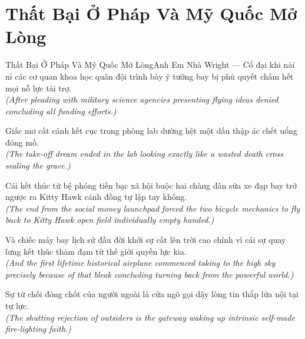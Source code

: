 \section{Thất Bại Ở Pháp Và Mỹ Quốc Mở Lòng}
\begin{truyen}{Thất Bại Ở Pháp Và Mỹ Quốc Mở Lòng}{Anh Em Nhà Wright --- Cổ đại}
 khi nài nỉ các cơ quan khoa học quân đội trình bày ý tưởng bay bị phủ quyết chấm hết mọi nỗ lực tài trợ.\\[4pt]
\textit{(After pleading with military science agencies presenting flying ideas denied concluding all funding efforts.)}

Giấc mơ cất cánh kết cục trong phòng lab dường hệt một dấu thập ác chết uổng đóng mồ.\\[4pt]
\textit{(The take-off dream ended in the lab looking exactly like a wasted death cross sealing the grave.)}

Cái kết thúc từ bệ phóng tiền bạc xã hội buộc hai chàng dân sửa xe đạp bay trở ngược ra Kitty Hawk cánh đồng tự lập tay không.\\[4pt]
\textit{(The end from the social money launchpad forced the two bicycle mechanics to fly back to Kitty Hawk open field individually empty handed.)}

Và chiếc máy bay lịch sử đầu đời khởi sự cất lên trời cao chính vì cái sự quay lưng kết thúc thảm đạm từ thế giới quyền lực kia.\\[4pt]
\textit{(And the first lifetime historical airplane commenced taking to the high sky precisely because of that bleak concluding turning back from the powerful world.)}

\end{truyen}
\begin{baihoc}
  Sự từ chối đóng chốt của người ngoài là cửa ngõ gọi dậy lòng tin thắp lửa nội tại tự lực.\\[4pt]
  \textit{(The shutting rejection of outsiders is the gateway waking up intrinsic self-made fire-lighting faith.)}
\end{baihoc}

